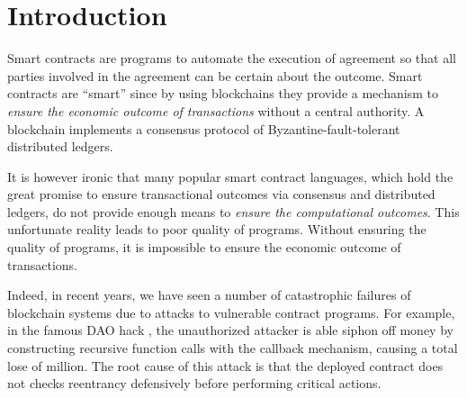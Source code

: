\section{Introduction} \label{sec:intro}






Smart contracts are programs to automate the execution of agreement so that all
parties involved in the agreement can be certain about the outcome.
Smart contracts are ``smart'' since by using blockchains they provide a
mechanism to \emph{ensure the economic outcome of transactions} without a
central authority.
A blockchain implements a consensus protocol of Byzantine-fault-tolerant
distributed ledgers.

It is however ironic that many popular smart contract languages, which hold the
great promise to ensure transactional outcomes via consensus and distributed
ledgers, do not provide enough means to \emph{ensure the computational outcomes}.
This unfortunate reality leads to poor quality of programs.
Without ensuring the quality of programs, it is impossible to ensure the
economic outcome of transactions.

Indeed, in recent years, we have seen a number of catastrophic failures of
blockchain systems due to attacks to vulnerable contract programs.
For example, in the famous DAO hack , the unauthorized attacker is
able siphon off money by constructing recursive function calls with
the callback mechanism, causing a total lose of  million.
The root cause of this attack is that the deployed contract does not
checks reentrancy defensively before performing critical actions.

